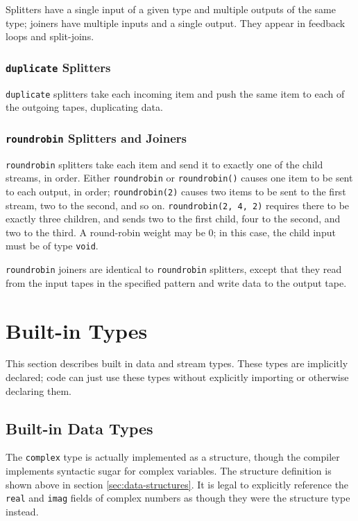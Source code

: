 \documentclass[11pt]{article}
\begin{document}
Splitters have a single input of a given type and multiple outputs of
the same type; joiners have multiple inputs and a single output.  They
appear in feedback loops and split-joins.

\subsubsection{\texttt{duplicate} Splitters}
\label{sec:expr-duplicate}

\texttt{duplicate} splitters take each incoming item and push the
same item to each of the outgoing tapes, duplicating data.

\subsubsection{\texttt{roundrobin} Splitters and Joiners}
\label{sec:expr-round-robin}

\texttt{roundrobin} splitters take each item and send it to exactly
one of the child streams, in order.  Either \texttt{roundrobin} or
\texttt{roundrobin()} causes one item to be sent to each output, in
order; \texttt{roundrobin(2)} causes two items to be sent to the first
stream, two to the second, and so on.  \texttt{roundrobin(2, 4, 2)}
requires there to be exactly three children, and sends two to the
first child, four to the second, and two to the third.  A round-robin
weight may be 0; in this case, the child input must be of type
\texttt{void}.

\texttt{roundrobin} joiners are identical to \texttt{roundrobin}
splitters, except that they read from the input tapes in the specified
pattern and write data to the output tape.


\section{Built-in Types}

This section describes built in data and stream types.  These types
are implicitly declared; code can just use these types without
explicitly importing or otherwise declaring them.

\subsection{Built-in Data Types}

The \texttt{complex} type is actually implemented as a structure,
though the compiler implements syntactic sugar for complex variables.
The structure definition is shown above in section
\ref{sec:data-structures}.
It is legal to explicitly reference the \texttt{real} and
\texttt{imag} fields of complex numbers as though they were the
structure type instead.
\end{document}
